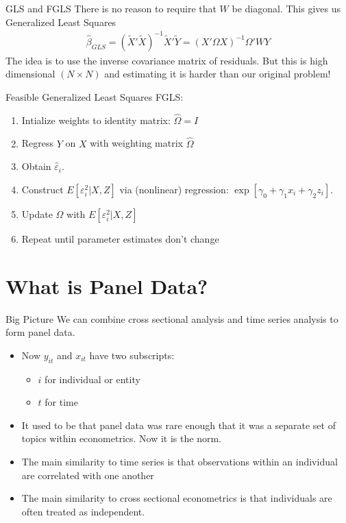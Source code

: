 \documentclass[aspectratio=169]{beamer}
\begin{document}
\begin{frame}{GLS and FGLS}
There is no reason to require that $W$ be diagonal. This gives us \alert{Generalized Least Squares}
\begin{align*}
\widehat{\beta}_{GLS} = (\tilde{X}'\tilde{X})^{-1}\tilde{X}'\tilde{Y} = (X' \Omega  X)^{-1} \Omega' W Y
\end{align*}
The idea is to use the \alert{inverse covariance matrix} of residuals. But this is high dimensional $(N \times N)$ and estimating it is harder than our original problem!

 Feasible Generalized Least Squares \alert{FGLS}:
\begin{enumerate}
\item Intialize weights to identity matrix: $\widehat{\Omega}= I$
\item Regress $Y$ on $X$ with weighting matrix $\widehat{\Omega}$
\item Obtain $\widehat{\varepsilon}_i$.
\item Construct $E[ \varepsilon_i^2 | X, Z]$ via (nonlinear) regression: $\exp[ \gamma_0 + \gamma_1 x_{i} + \gamma_2 z_{i}]$.
\item Update $\widehat{\Omega}$ with $E[ \varepsilon_i^2 | X, Z]$
\item Repeat until parameter estimates don't change
\end{enumerate}
\end{frame}



\section{What is Panel Data?}


\begin{frame}{Big Picture}
We can combine cross sectional analysis and time series analysis to form \alert{panel data}.
\begin{itemize}
\item Now $y_{it}$ and $x_{it}$ have two subscripts:
\begin{itemize}
\item $i$ for \alert{individual} or \alert{entity}
\item $t$ for \alert{time}
\end{itemize}
\item It used to be that panel data was rare enough that it was a separate set of topics within econometrics. Now it is the norm.
\item The main similarity to \alert{time series} is that observations within an individual are \alert{correlated} with one another
\item The main similarity to \alert{cross sectional} econometrics is that individuals are often treated as \alert{independent}.
\end{itemize}
\end{frame}
\end{document}
